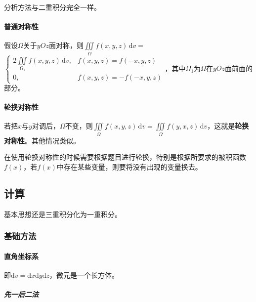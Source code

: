 \documentclass[UTF8, 12pt]{ctexart}
\begin{document}
        分析方法与二重积分完全一样。

        \paragraph{普通对称性} \leavevmode \medskip

        假设$\Omega$关于$yOz$面对称，则$\iiint\limits_\Omega f(x,y,z)\,\textrm{d}v=$\\$\left\{\begin{array}{ll}
                                                                                                 2\iiint\limits_{\Omega_1}f(x,y,z)\,\textrm{d}v, & f(x,y,z)=f(-x,y,z) \\
                                                                                                 0, & f(x,y,z)=-f(-x,y,z)
        \end{array}\right.$，其中$\Omega_1$为$\Omega$在$yOz$面前面的部分。

        \paragraph{轮换对称性} \leavevmode \medskip

        若把$x$与$y$对调后，$\Omega$不变，则$\iiint\limits_\Omega f(x,y,z)\,\textrm{d}v=\iiint\limits_\Omega f(y,x,z)\,\textrm{d}v$，这就是\textbf{轮换对称性}。其他情况类似。

        在使用轮换对称性的时候需要根据题目进行轮换，特别是根据所要求的被积函数$f(x)$，若$f(x)$中存在某些变量，则要将没有出现的变量换去。

        \subsection{计算}

        基本思想还是三重积分化为一重积分。

        \subsubsection{基础方法}

        \paragraph{直角坐标系} \leavevmode \medskip

        即$\textrm{d}v=\textrm{d}x\textrm{d}y\textrm{d}z$，微元是一个长方体。

        \subparagraph{先一后二法} \leavevmode \medskip
\end{document}
